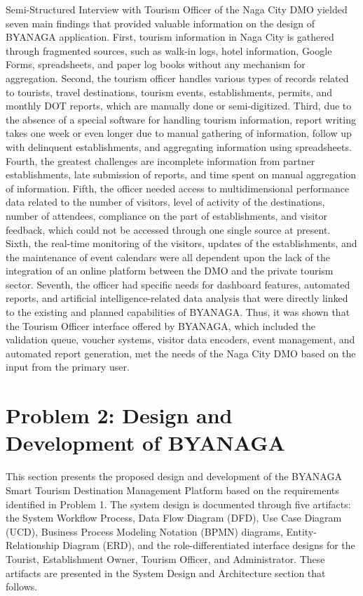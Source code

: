 \documentclass{research}
\begin{document}
Semi-Structured Interview with Tourism Officer of the Naga City DMO
yielded seven main findings that provided valuable information on the design
of BYANAGA application. First, tourism information in Naga City is gathered
through fragmented sources, such as walk-in logs, hotel information, Google
Forms, spreadsheets, and paper log books without any mechanism for aggregation.
Second, the tourism officer handles various types of records related to tourists,
travel destinations, tourism events, establishments, permits, and monthly DOT
reports, which are manually done or semi-digitized. Third, due to the absence
of a special software for handling tourism information, report writing takes
one week or even longer due to manual gathering of information, follow up
with delinquent establishments, and aggregating information using spreadsheets.
Fourth, the greatest challenges are incomplete information from partner establishments,
late submission of reports, and time spent on manual aggregation of information.
Fifth, the officer needed access to multidimensional performance data related to
the number of visitors, level of activity of the destinations, number of attendees,
compliance on the part of establishments, and visitor feedback, which could not be
accessed through one single source at present. Sixth, the real-time monitoring of
the visitors, updates of the establishments, and the maintenance of event calendars
were all dependent upon the lack of the integration of an online platform between
the DMO and the private tourism sector. Seventh, the officer had specific needs
for dashboard features, automated reports, and artificial intelligence-related data
analysis that were directly linked to the existing and planned capabilities of BYANAGA.
Thus, it was shown that the Tourism Officer interface offered by BYANAGA, which
included the validation queue, voucher systems, visitor data encoders, event
management, and automated report generation, met the needs of the Naga City DMO
based on the input from the primary user.

\section{Problem 2: Design and Development of BYANAGA}

This section presents the proposed design and development of the BYANAGA Smart 
Tourism Destination Management Platform based on the requirements identified in 
Problem 1. The system design is documented through five artifacts: the System Workflow Process, 
Data Flow Diagram (DFD), Use Case Diagram (UCD), Business Process Modeling Notation (BPMN) diagrams, 
Entity-Relationship Diagram (ERD), and the role-differentiated interface designs 
for the Tourist, Establishment Owner, Tourism Officer, and Administrator. These 
artifacts are presented in the System Design and Architecture section that follows.
\end{document}
